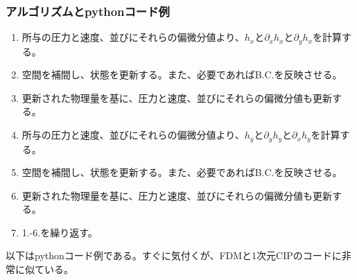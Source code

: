 \documentclass[dvipdfmx, 9pt, a4paper]{jsarticle}
\begin{document}
\subsubsection{アルゴリズムとpythonコード例}
\begin{tcolorbox}[title=M型CIPによる2次元移流方程式の求解]
\begin{enumerate}
\item 所与の圧力と速度、並びにそれらの偏微分値より、$h_x$と$\partial_xh_x$と$\partial_yh_x$を計算する。
\item 空間を補間し、状態を更新する。また、必要であればB.C.を反映させる。
\item 更新された物理量を基に、圧力と速度、並びにそれらの偏微分値も更新する。
\item 所与の圧力と速度、並びにそれらの偏微分値より、$h_y$と$\partial_yh_y$と$\partial_xh_y$を計算する。
\item 空間を補間し、状態を更新する。また、必要であればB.C.を反映させる。
\item 更新された物理量を基に、圧力と速度、並びにそれらの偏微分値も更新する。
\item 1.-6.を繰り返す。
\end{enumerate}
\end{tcolorbox}
以下はpythonコード例である。すぐに気付くが、FDMと1次元CIPのコードに非常に似ている。
\end{document}
